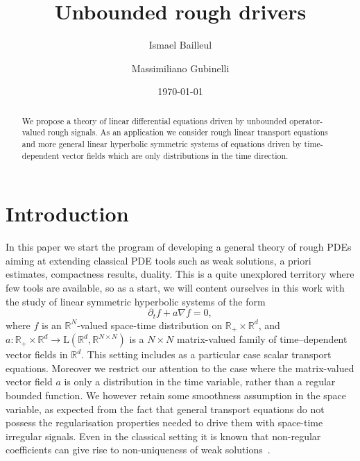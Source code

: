 \documentclass[11pt,a4paper]{amsart}
\title[Unbounded rough drivers]{Unbounded rough drivers}
\date{\today}
\author[I. Bailleul]{Ismael Bailleul}
\author[M. Gubinelli]{Massimiliano Gubinelli}
\newcommand{\RR}{\mathbb{R}}  \newcommand{\CC}{\mathbb{C}}  \newcommand{\LL}{\mathbb{L}}  \newcommand{\WW}{\mathbb{W}}
\theoremstyle{plain}%
\theoremstyle{definition}
\theoremstyle{remark}
\numberwithin{equation}{section} %
\begin{document}
\begin{abstract}
We propose a theory of linear differential equations driven by unbounded operator-valued rough signals. As an application we consider rough linear transport equations and more general linear hyperbolic symmetric systems of equations driven by time-dependent vector fields which are only distributions in the time direction. 
\end{abstract}

\maketitle

\section{Introduction}
\label{SectionIntroduction}

In this paper we start the program of developing a general theory of rough PDEs aiming at extending classical PDE tools such as weak solutions, a priori estimates, compactness results, duality. This is a quite unexplored territory where few tools are available, so as a start, we will content ourselves in this work with the study of linear symmetric hyperbolic systems of the form
\begin{equation}
\label{eq:basic}
\partial_t f + a\nabla f = 0,
\end{equation}
where $f$ is an $\RR^N$-valued space-time distribution on $\RR_+\times\RR^d$, and $a :\RR_+\times \RR^d \to  \textrm{L}(\RR^d, \RR^{N\times N})$ is a $N\times N$ matrix-valued family of time--dependent vector fields in $\RR^d$. This setting includes as a particular case scalar transport equations. Moreover we restrict our attention to the case where the matrix-valued vector field $a$ is only a distribution in the time variable, rather than a regular bounded function. We however retain some smoothness assumption in the space variable, as expected from the fact that general transport equations do not possess the regularisation properties needed to drive them with space-time irregular signals. Even in the classical setting it is known that non-regular coefficients  can give rise to non-uniqueness of weak solutions~\cite{FlandoliMilano}.

\smallskip
\end{document}
